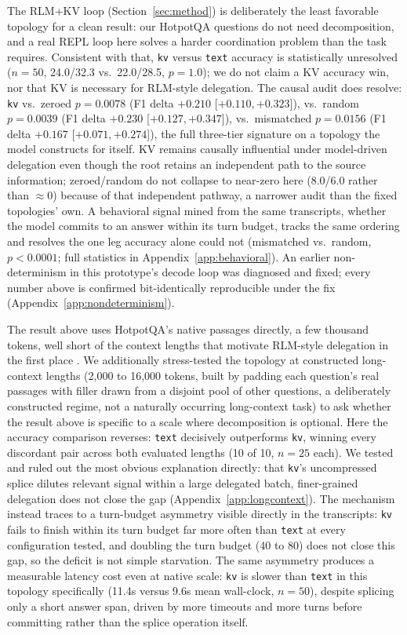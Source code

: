 \documentclass[11pt]{article}
\begin{document}
The RLM+KV loop (Section~\ref{sec:method}) is deliberately the least
favorable topology for a clean result: our HotpotQA questions do not
need decomposition, and a real REPL loop here solves a harder
coordination problem than the task requires. Consistent with that,
\texttt{kv} versus \texttt{text} accuracy is statistically unresolved
($n=50$, 24.0/32.3 vs.\ 22.0/28.5, $p=1.0$); we do not claim a KV
accuracy win, nor that KV is necessary for RLM-style delegation. The
causal audit does resolve: \texttt{kv} vs.\ zeroed $p=0.0078$ (F1 delta
$+0.210$ [$+0.110,+0.323$]), vs.\ random $p=0.0039$ (F1 delta $+0.230$
[$+0.127,+0.347$]), vs.\ mismatched $p=0.0156$ (F1 delta $+0.167$
[$+0.071,+0.274$]), the full three-tier signature on a
topology the model constructs for itself. KV remains causally
influential under model-driven delegation even though the root retains
an independent path to the source information; zeroed/random do not
collapse to near-zero here (8.0/6.0 rather than $\approx$0) because of
that independent pathway, a narrower audit than the fixed topologies'
own. A behavioral signal mined from the same transcripts, whether the
model commits to an answer within its turn budget, tracks the same
ordering and resolves the one leg accuracy alone could not (mismatched
vs.\ random, $p<0.0001$; full statistics in
Appendix~\ref{app:behavioral}). An earlier non-determinism in this
prototype's decode loop was diagnosed and fixed; every number above is
confirmed bit-identically reproducible under the fix
(Appendix~\ref{app:nondeterminism}).

The result above uses HotpotQA's native passages directly, a few
thousand tokens, well short of the context lengths that motivate
RLM-style delegation in the first place \citep{rlm2026}. We
additionally stress-tested the topology at constructed long-context
lengths (2,000 to 16,000 tokens, built by padding each question's real
passages with filler drawn from a disjoint pool of other questions, a
deliberately constructed regime, not a naturally occurring long-context
task) to ask whether the result above is specific to a scale where
decomposition is optional. Here the accuracy comparison reverses:
\texttt{text} decisively outperforms \texttt{kv}, winning every
discordant pair across both evaluated lengths (10 of 10, $n=25$ each).
We tested and ruled out the most obvious explanation directly: that
\texttt{kv}'s uncompressed splice dilutes relevant signal within a
large delegated batch, finer-grained delegation does not close the gap
(Appendix~\ref{app:longcontext}). The mechanism instead traces to a
turn-budget asymmetry visible directly in the transcripts: \texttt{kv}
fails to finish within its turn budget far more often than
\texttt{text} at every configuration tested, and doubling the turn
budget (40 to 80) does not close this gap, so the deficit is not
simple starvation. The same asymmetry produces a measurable latency
cost even at native scale: \texttt{kv} is slower than \texttt{text} in
this topology specifically (11.4s versus 9.6s mean wall-clock, $n=50$),
despite splicing only a short answer span, driven by more timeouts and
more turns before committing rather than the splice operation itself.
\end{document}
